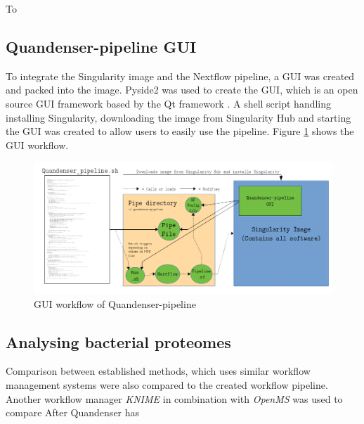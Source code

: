 To

\subsection{Quandenser-pipeline GUI}
To integrate the Singularity image and the Nextflow pipeline, a GUI was created and packed into the image. Pyside2 was used to create the GUI, which is an open source GUI framework based by the Qt framework \cite{pyside2}. A shell script handling installing Singularity, downloading the image from Singularity Hub and starting the GUI was created to allow users to easily use the pipeline. Figure \ref{fig:GUI_workflow} shows the GUI workflow.

\begin{figure}[!htbp]
  \includegraphics[width=\linewidth]{pictures/GUI_workflow.png}
  \caption{GUI workflow of Quandenser-pipeline}
  \label{fig:GUI_workflow}
\end{figure}

\subsection{Analysing bacterial proteomes}
Comparison between established methods, which uses similar workflow management systems were also compared to the created workflow pipeline. Another workflow manager \textit{KNIME} in combination with \textit{OpenMS} was used to compare
After Quandenser has
